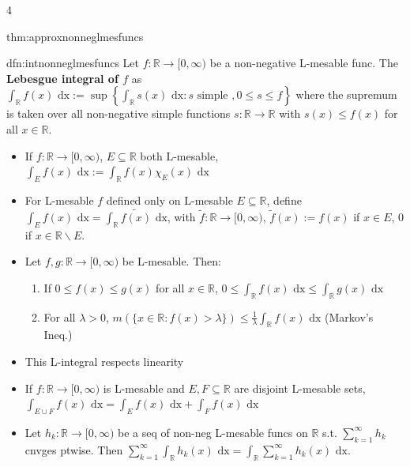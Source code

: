 \documentclass[landscape, 8pt]{extarticle}
\begin{document}
\begin{multicols*}{4}
\begin{thm}{thm:approxnonneglmesfuncs}{ }
		\end{thm}
		
		
		\begin{dfn-s}{dfn:intnonneglmesfuncs}{ }
			Let $f: \mathbb{R} \to [0, \infty)$ be a non-negative L-mesable func. The \textbf{Lebesgue integral of $f$} as $\int_{\mathbb{R}}f(x) \text{ dx} := \sup\left\{\int_{\mathbb{R}}s(x) \text{ dx} : s \text{ simple }, 0 \le s \le f\right\}$ where the supremum is taken over all non-negative simple functions $s: \mathbb{R} \to \mathbb{R}$ with $s(x) \le f(x)$ for all $x\in \mathbb{R}$.
			\begin{itemize}
				\item If $f: \mathbb{R} \to [0, \infty)$, $E \subseteq \mathbb{R}$ both L-mesable, $\int_E f(x) \text{ dx} := \int_{\mathbb{R}} f(x) \chi_E(x) \text{ dx}$
				\item For L-mesable $f$ defined only on L-mesable $E \subseteq \mathbb{R}$, define $\int_E f(x) \text{ dx} = \int_{\mathbb{R}}\tilde{f(x)} \text{ dx}$, with $\tilde{f}: \mathbb{R}\to [0,\infty)$, $\tilde{f}(x) := f(x)$ if $x\in E$, $0$ if $x\in \mathbb{R} \backslash E$.
				\item Let $f, g : \mathbb{R} \to [0, \infty)$ be L-mesable. Then:
					\begin{enumerate}[label=(\arabic*)]
						\item If $0 \le f(x) \le g(x)$ for all $x\in \mathbb{R}$, $0 \le \int_{\mathbb{R}}f(x) \text{ dx} \le \int_{\mathbb{R}}g(x) \text{ dx}$
						\item For all $\lambda > 0$, $m\left(\{x\in \mathbb{R} : f(x) > \lambda\}\right) \le \frac{1}{\lambda} \int_{\mathbb{R}}f(x) \text{ dx}$ (Markov's Ineq.)
					\end{enumerate} 
				\item This L-integral respects linearity
				\item If $f: \mathbb{R} \to [0, \infty)$ is L-mesable and $E, F \subseteq \mathbb{R}$ are disjoint L-mesable sets, $\int_{E \cup F} f(x) \text{ dx} = \int_E f(x) \text{ dx} + \int_F f(x) \text{ dx}$
				\item Let $h_k : \mathbb{R} \to [0, \infty)$ be a seq of non-neg L-mesable funcs on $\mathbb{R}$ s.t. $\sum_{k=1}^{\infty}h_k$ cnvges ptwise. Then $\sum_{k=1}^{\infty} \int_{\mathbb{R}}h_k(x) \text{ dx} = \int_{\mathbb{R}}\sum_{k=1}^{\infty}h_k(x) \text{ dx}$.
			\end{itemize}
			
		\end{dfn-s}
		

\end{multicols*}
\end{document}
